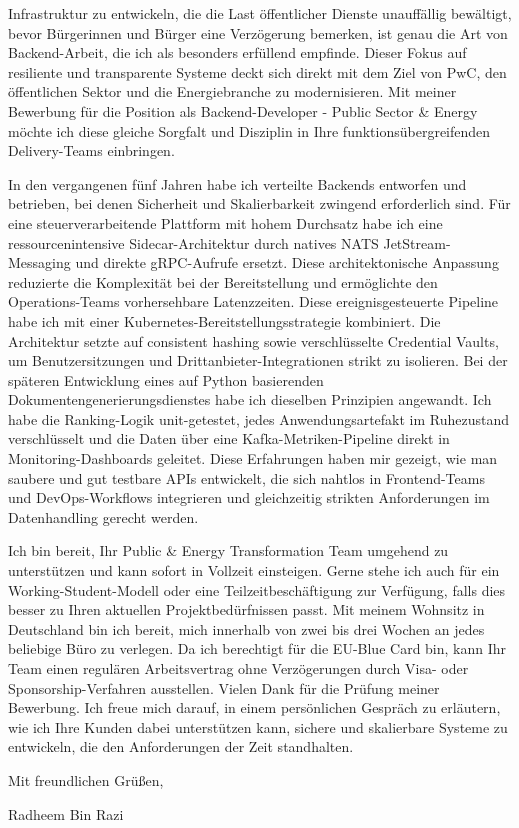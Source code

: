 \documentclass[11pt,a4paper]{coverletter}
\begin{document}
Infrastruktur zu entwickeln, die die Last öffentlicher Dienste unauffällig bewältigt, bevor Bürgerinnen und Bürger eine Verzögerung bemerken, ist genau die Art von Backend-Arbeit, die ich als besonders erfüllend empfinde. Dieser Fokus auf resiliente und transparente Systeme deckt sich direkt mit dem Ziel von PwC, den öffentlichen Sektor und die Energiebranche zu modernisieren. Mit meiner Bewerbung für die Position als Backend-Developer - Public Sector \& Energy möchte ich diese gleiche Sorgfalt und Disziplin in Ihre funktionsübergreifenden Delivery-Teams einbringen.

In den vergangenen fünf Jahren habe ich verteilte Backends entworfen und betrieben, bei denen Sicherheit und Skalierbarkeit zwingend erforderlich sind. Für eine steuerverarbeitende Plattform mit hohem Durchsatz habe ich eine ressourcenintensive Sidecar-Architektur durch natives NATS JetStream-Messaging und direkte gRPC-Aufrufe ersetzt. Diese architektonische Anpassung reduzierte die Komplexität bei der Bereitstellung und ermöglichte den Operations-Teams vorhersehbare Latenzzeiten. Diese ereignisgesteuerte Pipeline habe ich mit einer Kubernetes-Bereitstellungsstrategie kombiniert. Die Architektur setzte auf consistent hashing sowie verschlüsselte Credential Vaults, um Benutzersitzungen und Drittanbieter-Integrationen strikt zu isolieren. Bei der späteren Entwicklung eines auf Python basierenden Dokumentengenerierungsdienstes habe ich dieselben Prinzipien angewandt. Ich habe die Ranking-Logik unit-getestet, jedes Anwendungsartefakt im Ruhezustand verschlüsselt und die Daten über eine Kafka-Metriken-Pipeline direkt in Monitoring-Dashboards geleitet. Diese Erfahrungen haben mir gezeigt, wie man saubere und gut testbare APIs entwickelt, die sich nahtlos in Frontend-Teams und DevOps-Workflows integrieren und gleichzeitig strikten Anforderungen im Datenhandling gerecht werden.

Ich bin bereit, Ihr Public \& Energy Transformation Team umgehend zu unterstützen und kann sofort in Vollzeit einsteigen. Gerne stehe ich auch für ein Working-Student-Modell oder eine Teilzeitbeschäftigung zur Verfügung, falls dies besser zu Ihren aktuellen Projektbedürfnissen passt. Mit meinem Wohnsitz in Deutschland bin ich bereit, mich innerhalb von zwei bis drei Wochen an jedes beliebige Büro zu verlegen. Da ich berechtigt für die EU-Blue Card bin, kann Ihr Team einen regulären Arbeitsvertrag ohne Verzögerungen durch Visa- oder Sponsorship-Verfahren ausstellen. Vielen Dank für die Prüfung meiner Bewerbung. Ich freue mich darauf, in einem persönlichen Gespräch zu erläutern, wie ich Ihre Kunden dabei unterstützen kann, sichere und skalierbare Systeme zu entwickeln, die den Anforderungen der Zeit standhalten.

\closing{Mit freundlichen Grüßen,}{Radheem Bin Razi}
\end{document}
